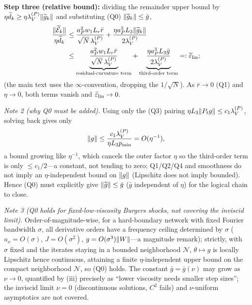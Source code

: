 \documentclass[11pt]{article}
\DeclarePairedDelimiter{\norm}{\lVert}{\rVert}
\newcommand{\W}{W}
\newcommand{\Erem}{\mathcal E}
\newcommand{\wt}[1]{\widetilde{#1}}
\numberwithin{equation}{section}
\begin{document}
\noindent\textbf{Step three (relative bound):} dividing the remainder upper bound by $\eta\wt d_k\ge\eta\lambda_V^{(P)}\norm{\wt g_k}$ and substituting (Q0) $\norm{\wt g_k}\le\bar g$,
\begin{align}
\frac{\norm{\wt\Erem_k}}{\eta\wt d_k}
&\le\frac{a_P^2w_1L_r\bar r}{\sqrt N\,\lambda_V^{(P)}}
+\frac{\eta a_P^3L_3\norm{\wt g_k}}{2\lambda_V^{(P)}}\notag\\
&\le\underbrace{\frac{a_P^2w_1L_r\bar r}{\sqrt N\,\lambda_V^{(P)}}}_{\text{residual-curvature term}}
+\underbrace{\frac{\eta a_P^3L_3\bar g}{2\lambda_V^{(P)}}}_{\text{third-order term}}
=:\wt\varepsilon_{\rm lin};
\end{align}
(the main text uses the $\infty$-convention, dropping the $1/\sqrt N$). As $\bar r\to0$ (Q1) and $\eta\to0$, both terms vanish and $\wt\varepsilon_{\rm lin}\to0$.

\noindent\emph{Note 2 (why Q0 must be added).} Using only the (Q3) pairing $\eta L_3\norm{P_tg}\le c_1\lambda_V^{(P)}$, solving back gives only
\begin{equation}
\norm g\le\frac{c_1\lambda_V^{(P)}}{\eta L_3p_{\min}}=O(\eta^{-1}),
\end{equation}
a bound growing like $\eta^{-1}$, which cancels the outer factor $\eta$ so the third-order term is only $\le c_1/2$---a constant, not tending to zero; Q1/Q2/Q4 and smoothness do not imply an $\eta$-independent bound on $\norm g$ (Lipschitz does not imply bounded). Hence (Q0) must explicitly give $\norm{\wt g}\le\bar g$ ($\bar g$ independent of $\eta$) for the logical chain to close.

\noindent\emph{Note 3 (Q0 holds for fixed-low-viscosity Burgers shocks, not covering the inviscid limit).} Order-of-magnitude-wise, for a hard-boundary network with fixed Fourier bandwidth $\sigma$, all derivative orders have a frequency ceiling determined by $\sigma$ ($u_x=O(\sigma)$, $J=O(\sigma^2)$, $g=O(\sigma^3)\norm\W$---a magnitude remark); strictly, with $\sigma$ fixed and the iterates staying in a bounded neighborhood $\mathcal N$, $\theta\mapsto g$ is locally Lipschitz hence continuous, attaining a finite $\eta$-independent upper bound on the compact neighborhood $\mathcal N$, so (Q0) holds. The constant $\bar g=\bar g(\nu)$ may grow as $\nu\to0$, quantified by (iii) precisely as ``lower viscosity needs smaller step sizes''; the inviscid limit $\nu=0$ (discontinuous solutions, $C^2$ fails) and $\nu$-uniform asymptotics are not covered.
\end{document}
